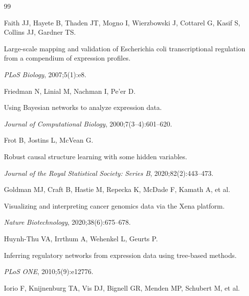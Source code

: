 \documentclass[12pt,a4paper]{article}
\begin{document}
\begin{thebibliography}{99}

Faith JJ, Hayete B, Thaden JT, Mogno I, Wierzbowski J, Cottarel G, Kasif S, Collins JJ, Gardner TS.




Large-scale mapping and validation of Escherichia coli transcriptional regulation from a compendium of expression profiles.




\textit{PLoS Biology}, 2007;5(1):e8.




Friedman N, Linial M, Nachman I, Pe'er D.




Using Bayesian networks to analyze expression data.




\textit{Journal of Computational Biology}, 2000;7(3--4):601--620.




Frot B, Jostins L, McVean G.




Robust causal structure learning with some hidden variables.




\textit{Journal of the Royal Statistical Society: Series B}, 2020;82(2):443--473.




Goldman MJ, Craft B, Hastie M, Repecka K, McDade F, Kamath A, et al.




Visualizing and interpreting cancer genomics data via the Xena platform.




\textit{Nature Biotechnology}, 2020;38(6):675--678.




Huynh-Thu VA, Irrthum A, Wehenkel L, Geurts P.




Inferring regulatory networks from expression data using tree-based methods.




\textit{PLoS ONE}, 2010;5(9):e12776.




Iorio F, Knijnenburg TA, Vis DJ, Bignell GR, Menden MP, Schubert M, et al.





\end{thebibliography}
\end{document}
